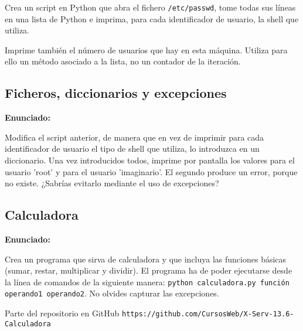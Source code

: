 Crea un script en Python que abra el fichero \verb|/etc/passwd|, tome todas sus líneas en una lista de Python e imprima, para cada identificador de usuario, la shell que utiliza.

Imprime también el número de usuarios que hay en esta máquina. Utiliza para
ello un método asociado a la lista, no un contador de la iteración.

\subsection{Ficheros, diccionarios y excepciones}
\label{subsec:ficheros-dic-excep}

\textbf{Enunciado:}

Modifica el script
anterior, de manera que en vez de imprimir para cada identificador de usuario el tipo
de shell que utiliza, lo introduzca en un diccionario. Una vez introducidos todos, imprime por pantalla los valores para el usuario 'root' y para el
usuario 'imaginario'. El segundo produce un error, porque no existe. ¿Sabrías evitarlo mediante el uso de
excepciones?


\subsection{Calculadora}
\label{subsec:calculadora}

\textbf{Enunciado:}

Crea un programa que sirva de calculadora y que incluya las funciones
básicas (sumar, restar, multiplicar y dividir). El programa ha de poder ejecutarse desde la línea de comandos de la siguiente manera: \texttt{python calculadora.py
función operando1 operando2}. No olvides capturar las excepciones.

Parte del repositorio en GitHub \verb|https://github.com/CursosWeb/X-Serv-13.6-Calculadora|

\newpage


